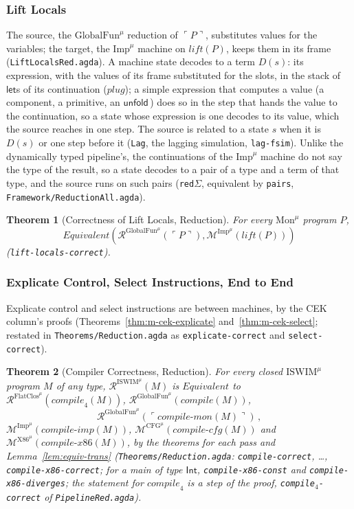 \documentclass[10pt]{article}
\theoremstyle{acmplain}
\newtheorem{theorem}{Theorem}[section]
\newcommand{\key}[1]{\mathsf{#1}}
\newcommand{\pass}[1]{\mathit{#1}}
\newcommand{\Mach}[1]{\mathcal{M}^{#1}}
\newcommand{\Equiv}{\mathit{Equivalent}}
\newcommand{\Tembed}[1]{\ulcorner #1 \urcorner}  %
\newcommand{\Ml}[1]{\textrm{#1}^{\mu}}                  %
\newcommand{\Munfold}{\key{unfold}\,}
\begin{document}
\subsubsection{Lift Locals}

The source, the $\Ml{GlobalFun}$ reduction of $\Tembed{P}$, substitutes values
for the variables; the target, the $\Ml{Imp}$ machine on $\pass{lift}(P)$,
keeps them in its frame (\texttt{LiftLocalsRed.agda}). A machine state
decodes to a term $D(s)$: its expression, with the values of its frame
substituted for the slots, in the stack of $\key{let}$s of its continuation
($\mathit{plug}$); a simple expression that computes a value (a component,
a primitive, an $\Munfold$) does so in the step that hands the value to the
continuation, so a state whose expression is one decodes to its value,
which the source reaches in one step. The source is related to a state $s$
when it is $D(s)$ or one step before it (\texttt{Lag}, the lagging
simulation, \texttt{lag-fsim}). Unlike the dynamically typed pipeline's,
the continuations of the $\Ml{Imp}$ machine do not say the type of the
result, so a state decodes to a pair of a type and a term of that type, and
the source runs on such pairs (\texttt{red$\Sigma$}, equivalent by
\texttt{pairs}, \texttt{Framework/ReductionAll.agda}).
\begin{theorem}[Correctness of Lift Locals, Reduction]\label{thm:m-red-lift}
For every $\Ml{Mon}$ program $P$,
\[ \Equiv(\mathcal{R}^{\Ml{GlobalFun}}(\Tembed{P}), \Mach{\Ml{Imp}}(\pass{lift}(P))) \]
(\texttt{lift-locals-correct}).
\end{theorem}

\subsubsection{Explicate Control, Select Instructions, End to End}

Explicate control and select instructions are between machines, by the
CEK column's proofs (Theorems~\ref{thm:m-cek-explicate}
and~\ref{thm:m-cek-select}; restated in \texttt{Theorems/\allowbreak Reduction.agda}
as \texttt{explicate-correct} and \texttt{select-correct}).
\begin{theorem}[Compiler Correctness, Reduction]\label{thm:m-red-compiler}
For every closed $\Ml{ISWIM}$ program $M$ of any type,
$\mathcal{R}^{\Ml{ISWIM}}(M)$ is $\Equiv$ to
$\mathcal{R}^{\Ml{FlatClos}}(\pass{compile}_4(M))$,
$\mathcal{R}^{\Ml{GlobalFun}}(\pass{compile}(M))$,
\[ \mathcal{R}^{\Ml{GlobalFun}}(\Tembed{\pass{compile\text{-}mon}(M)})\,, \]
$\Mach{\Ml{Imp}}(\pass{compile\text{-}imp}(M))$,
$\Mach{\Ml{CFG}}(\pass{compile\text{-}cfg}(M))$ and
$\Mach{\Ml{X86}}(\pass{compile\text{-}x86}(M))$, by the theorems for each pass
and Lemma~\ref{lem:equiv-trans} (\texttt{Theorems/\allowbreak Reduction.agda}:
\texttt{compile-correct}, \ldots, \texttt{compile-x86-correct}; for a
main of type $\key{Int}$, \texttt{compile-x86-const} and
\texttt{compile-x86-diverges}; the statement for $\pass{compile}_4$ is a
step of the proof, \texttt{compile$_4$-correct} of
\texttt{PipelineRed.agda}).
\end{theorem}
\end{document}
